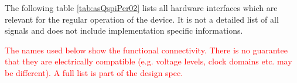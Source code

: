 The following table \ref{tab:asQspiPer02} lists all hardware interfaces which are relevant for the regular operation of the device. It is not a detailed list of all signals and does not include implementation specific informations.

\textcolor{red}{The names used below show the functional connectivity. There is no guarantee that they are electrically compatible (e.g. voltage levels, clock domains etc. may be different). A full list is part of the design spec.}
